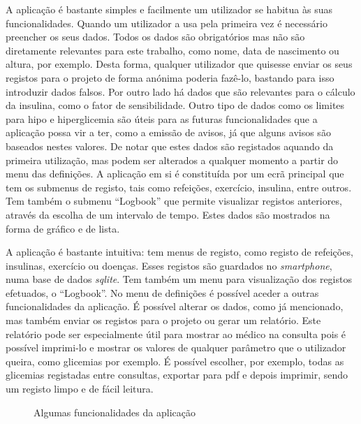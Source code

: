 A aplicação é bastante simples e facilmente um utilizador se habitua às suas funcionalidades. Quando um utilizador a usa pela primeira vez é necessário preencher os seus dados. Todos os dados são obrigatórios mas não são diretamente relevantes para este trabalho, como nome, data de nascimento ou altura, por exemplo. Desta forma, qualquer utilizador que quisesse enviar os seus registos para o projeto de forma anónima poderia fazê-lo, bastando para isso introduzir dados falsos. 
Por outro lado há dados que são relevantes para o cálculo da insulina, como o fator de sensibilidade. Outro tipo de dados como os limites para hipo e hiperglicemia são úteis para as futuras funcionalidades que a aplicação possa vir a ter, como a emissão de avisos, já que alguns avisos são baseados nestes valores. De notar que estes dados são registados aquando da primeira utilização, mas podem ser alterados a qualquer momento a partir do menu das definições.
A aplicação em si é constituída por um ecrã principal que tem os submenus de registo, tais como refeições, exercício, insulina, entre outros. Tem também o submenu ``Logbook'' que permite visualizar registos anteriores, através da escolha de um intervalo de tempo. Estes dados são mostrados na forma de gráfico e de lista.

A aplicação é bastante intuitiva: tem menus de registo, como registo de refeições, insulinas, exercício ou doenças. Esses registos são guardados no \textit{smartphone}, numa base de dados \textit{sqlite}. Tem também um menu para visualização dos registos efetuados, o ``Logbook''. 
No menu de definições é possível aceder a outras funcionalidades da aplicação. É possível alterar os dados, como já mencionado, mas também enviar os registos para o projeto ou gerar um relatório. Este relatório pode ser especialmente útil para mostrar ao médico na consulta pois é possível imprimi-lo e mostrar os valores de qualquer parâmetro que o utilizador queira, como glicemias por exemplo. É possível escolher, por exemplo, todas as glicemias registadas entre consultas, exportar para pdf e depois imprimir, sendo um registo limpo e de fácil leitura.


\begin{figure}[H]
    \centering
    \qquad
    \caption{Algumas funcionalidades da aplicação}%
    \label{fig:example}%
\end{figure}

